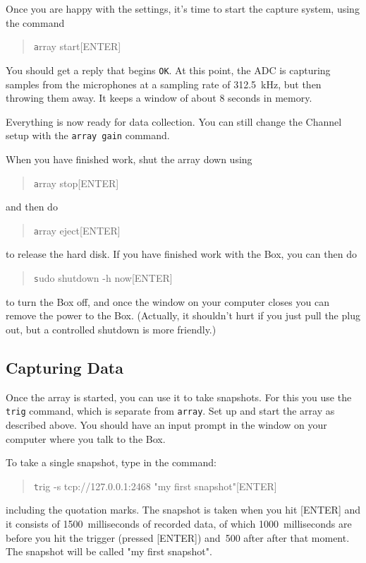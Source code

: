 \documentclass[12pt]{article}
\begin{document}
Once you are happy with the settings, it's time to start the capture
system, using the command
\begin{quotation}\texttt
      array start[ENTER]
\end{quotation}
You should get a reply that begins \texttt{OK}.  At this point, the
ADC is capturing samples from the microphones at a sampling rate of
312.5~kHz, but then throwing them away.  It keeps a window of about 8
seconds in memory.

Everything is now ready for data collection.  You can still change the
Channel setup with the \texttt{array gain} command.

When you have finished work, shut the array down using
\begin{quotation}\texttt
      array stop[ENTER]
\end{quotation}
and then do
\begin{quotation}\texttt
      array eject[ENTER]
\end{quotation}
to release the hard disk.  If you have finished work with the Box, you
can then do
\begin{quotation}\texttt
      sudo shutdown -h now[ENTER]
\end{quotation}
to turn the Box off, and once the window on your computer closes you
can remove the power to the Box.  (Actually, it shouldn't hurt if you
just pull the plug out, but a controlled shutdown is more friendly.)

\subsection{Capturing Data}

Once the array is started, you can use it to take snapshots.  For this
you use the \texttt{trig} command, which is separate from
\texttt{array}.  Set up and start the array as described above.  You
should have an input prompt in the window on your computer where you
talk to the Box.

To take a single snapshot, type in the command:
\begin{quotation}\texttt
      trig -s tcp://127.0.0.1:2468 "my first snapshot"[ENTER]
\end{quotation}
including the quotation marks.  The snapshot is taken when you hit
[ENTER] and it consists of 1500~milliseconds of recorded data, of
which 1000~milliseconds are before you hit the trigger (pressed
[ENTER]) and~500 after after that moment.  The snapshot will be called
"my first snapshot".
\end{document}
